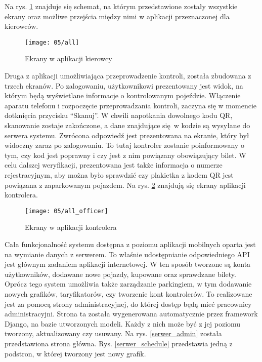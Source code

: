 Na rys. \ref{przejscia_kierowca} znajduje się schemat, na którym przedstawione zostały wszystkie ekrany oraz możliwe przejścia między nimi w aplikacji przeznaczonej dla kierowców.

\newpage

\begin{figure}[h!]
	\begin{center}
		\texttt{[image: 05/all]}
	\end{center}
	\caption{Ekrany w aplikacji kierowcy}
	\label{przejscia_kierowca}
\end{figure}

\newpage

Druga z aplikacji umożliwiająca przeprowadzenie kontroli, została zbudowana z trzech ekranów. Po zalogowaniu, użytkownikowi prezentowany jest widok, na którym będą wyświetlane informacje o kontrolowanym pojeździe. Włączenie aparatu telefonu i rozpoczęcie przeprowadzania kontroli, zaczyna się w momencie dotknięcia przycisku ``Skanuj''. W chwili napotkania dowolnego kodu QR, skanowanie zostaje zakończone, a dane znajdujące się w kodzie są wysyłane do serwera systemu. Zwrócona odpowiedź jest prezentowana na ekranie, który był widoczny zaraz po zalogowaniu. To tutaj kontroler zostanie poinformowany o tym, czy kod jest poprawny i czy jest z nim powiązany obowiązujący bilet. W celu dalszej weryfikacji, prezentowana jest także informacja o numerze rejestracyjnym, aby można było sprawdzić czy plakietka z kodem QR jest powiązana z zaparkowanym pojazdem. Na rys. \ref{przejscia_kontroler} znajdują się ekrany aplikacji kontrolera.

\begin{figure}[h!]
	\begin{center}
		\texttt{[image: 05/all\_officer]}
	\end{center}
	\caption{Ekrany w aplikacji kontrolera}
	\label{przejscia_kontroler}
\end{figure}

Cała funkcjonalność systemu dostępna z poziomu aplikacji mobilnych oparta jest na wymianie danych z serwerem. To właśnie udostępnianie odpowiedniego API jest głównym zadaniem aplikacji internetowej. W ten sposób tworzone są konta użytkowników, dodawane nowe pojazdy, kupowane oraz sprawdzane bilety. Oprócz tego system umożliwia także zarządzanie parkingiem, w tym dodawanie nowych grafików, taryfikatorów, czy tworzenie kont kontrolerów. To realizowane jest za pomocą strony administracyjnej, do której dostęp będą mieć pracownicy administracyjni. Strona ta została wygenerowana automatycznie przez framework Django, na bazie utworzonych modeli. Każdy z nich może być z jej poziomu tworzony, aktualizowany czy usuwany. Na rys. \ref{serwer_admin} została przedstawiona strona główna. Rys. \ref{serwer_schedule} przedstawia jedną z podstron, w której tworzony jest nowy grafik.

